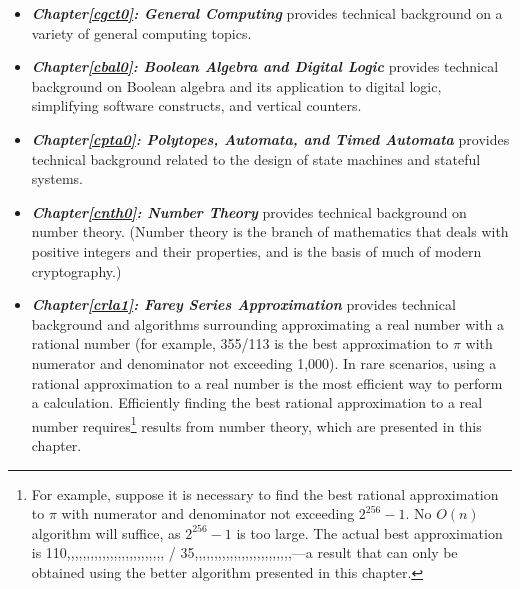 \begin{itemize}
\item \emph{\textbf{Chapter\postchapterwordnonstretchable{}\ref{cgct0}: 
      General Computing}} provides technical background on a variety of general 
      computing topics.  
\item \emph{\textbf{Chapter\postchapterwordnonstretchable{}\ref{cbal0}: 
      Boolean Algebra and Digital Logic}} provides technical background on 
      Boolean algebra and its application to digital logic, simplifying software 
      constructs, and vertical counters.  
\item \emph{\textbf{Chapter\postchapterwordnonstretchable{}\ref{cpta0}: 
      Polytopes, Automata, and Timed Automata}} provides technical background 
      related to the design of state machines and stateful systems.  
\item \emph{\textbf{Chapter\postchapterwordnonstretchable{}\ref{cnth0}: 
      Number Theory}} provides technical background on number theory.  (Number 
      theory is the branch of mathematics that deals with positive integers and 
      their properties, and is the basis of much of modern cryptography.) 
\item \emph{\textbf{Chapter\postchapterwordnonstretchable{}\ref{crla1}: 
      Farey Series Approximation}} provides technical background and algorithms 
      surrounding approximating a real number with a rational number (for 
      example, 355/113 is the best approximation to $\pi$ with numerator and 
      denominator not exceeding 1,000).  In rare scenarios, using a rational 
      approximation to a real number is the most efficient way to perform a 
      calculation.  Efficiently finding the best rational approximation to a 
      real number requires\footnote{For example, suppose it is necessary to find 
      the best rational approximation to $\pi$ with numerator and denominator 
      not exceeding $2^{256}-1$.  No $O(n)$ algorithm will suffice, as 
      $2^{256}-1$ is too large.  The actual best approximation is 
      110,,,,,,,,,,,,,,,,,,,,,,,,, / 35,,,,,,,,,,,,,,,,,,,,,,,,,---a result that can only be obtained using the better 
      algorithm presented in this chapter.} results from number theory, which 
      are presented in this chapter.  

\end{itemize}

